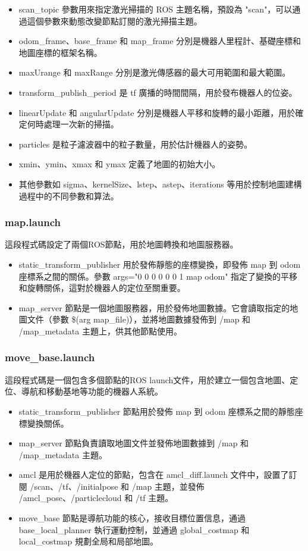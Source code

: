 \begin{itemize}
    \item scan\_topic 參數用來指定激光掃描的 ROS 主題名稱，預設為 "scan"，可以通過這個參數來動態改變節點訂閱的激光掃描主題。
    \item odom\_frame、base\_frame 和 map\_frame 分別是機器人里程計、基礎座標和地圖座標的框架名稱。
    \item maxUrange 和 maxRange 分別是激光傳感器的最大可用範圍和最大範圍。
    \item transform\_publish\_period 是 tf 廣播的時間間隔，用於發布機器人的位姿。
    \item linearUpdate 和 angularUpdate 分別是機器人平移和旋轉的最小距離，用於確定何時處理一次新的掃描。
    \item particles 是粒子濾波器中的粒子數量，用於估計機器人的姿勢。
    \item xmin、ymin、xmax 和 ymax 定義了地圖的初始大小。
    \item 其他參數如 sigma、kernelSize、lstep、astep、iterations 等用於控制地圖建構過程中的不同參數和算法。
\end{itemize}
\subsubsection{map.launch}
這段程式碼設定了兩個ROS節點，用於地圖轉換和地圖服務器。

\begin{itemize}
    \item static\_transform\_publisher 用於發佈靜態的座標變換，即發佈 map 到 odom 座標系之間的關係。參數 args="0 0 0 0 0 0 1 map odom" 指定了變換的平移和旋轉關係，這對於機器人的定位至關重要。
    \item map\_server 節點是一個地圖服務器，用於發佈地圖數據。它會讀取指定的地圖文件（參數 \$(arg map\_file)），並將地圖數據發佈到 /map 和 /map\_metadata 主題上，供其他節點使用。
\end{itemize}

\subsubsection{move\_base.launch}
這段程式碼是一個包含多個節點的ROS launch文件，用於建立一個包含地圖、定位、導航和移動基地等功能的機器人系統。

\begin{itemize}
    \item static\_transform\_publisher 節點用於發佈 map 到 odom 座標系之間的靜態座標變換關係。
    \item map\_server 節點負責讀取地圖文件並發佈地圖數據到 /map 和 /map\_metadata 主題。
    \item amcl 是用於機器人定位的節點，包含在 amcl\_diff.launch 文件中，設置了訂閱 /scan、/tf、/initialpose 和 /map 主題，並發佈 /amcl\_pose、/particlecloud 和 /tf 主題。

    \item move\_base 節點是導航功能的核心，接收目標位置信息，通過 base\_local\_planner 執行運動控制，並通過 global\_costmap 和 local\_costmap 規劃全局和局部地圖。
\end{itemize}

